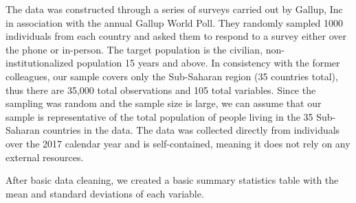 \documentclass[12pt]{article}
\begin{document}
The data was constructed through a series of surveys carried out by
Gallup, Inc in association with the annual Gallup World Poll. They
randomly sampled 1000 individuals from each country and asked them to
respond to a survey either over the phone or in-person. The target
population is the civilian, non-institutionalized population 15 years
and above. In consistency with the former colleagues, our sample covers
only the Sub-Saharan region (35 countries total), thus there are 35,000
total observations and 105 total variables. Since the sampling was
random and the sample size is large, we can assume that our sample is
representative of the total population of people living in the 35
Sub-Saharan countries in the data. The data was collected directly from
individuals over the 2017 calendar year and is self-contained, meaning
it does not rely on any external resources.

After basic data cleaning, we created a basic summary statistics table
with the mean and standard deviations of each variable.
\end{document}
